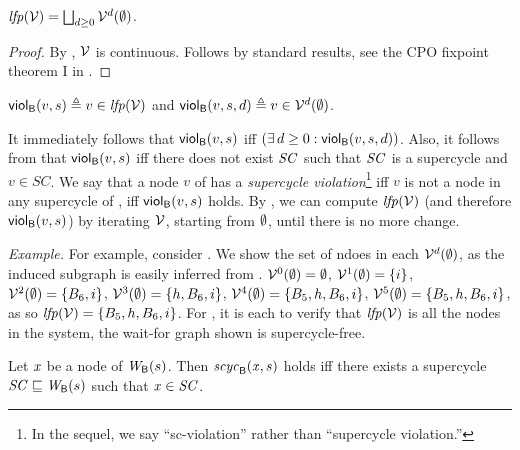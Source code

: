 \begin{proposition}  \label{prop:computeLFP}
$\lfp{\VFs} = \JOIN_{d \ge 0} \VFs^{d} (\ewfg)$.
\end{proposition}
%
\begin{proof}
By , $\VFs$ is continuous. Follows by standard results, \eg see the CPO fixpoint theorem I in 
\cite{DP02}.
\end{proof}



\begin{definition}
\label{def:supercycle-violation}
\label{def:supercycle.violation}
\label{defn:supercycle.violation}
$\scV{v}{s} \df v \in \lfp{\VFs}$ and 
$\scVd{v}{d}{s} \df v \in \VFs^{d} (\ewfg)$.
\end{definition}
%
It immediately follows that $\scV{v}{s}$ iff  $(\ex d \ge 0: \scVd{v}{d}{s})$.
Also, it follows from  that $\scV{v}{s}$ iff there does not exist $\SC$ such that $\SC$ is a supercycle and $v \in SC$.
We say that a node $v$ of  has a \emph{supercycle violation}\footnote{In the sequel, we say ``sc-violation'' rather than ``supercycle violation.''} iff $v$ is not a node in any supercycle of , 
\ie iff $\scV{v}{s}$ holds. 
By , we can compute $\lfp{\VFs}$ (and therefore $\scV{v}{s}$) by iterating $\VFs$, starting from $\ewfg$, until there is no more change.

\vspace{1ex}
\textit{Example.} 
For example, consider . We show the set of ndoes in each $\VFs^{d} (\ewfg)$, as the induced subgraph is easily inferred from .
$\VFs^{0} (\ewfg) = \ewfg$,
$\VFs^{1} (\ewfg) = \set{i}$, 
$\VFs^{2} (\ewfg) = \set{B_6, i}$, 
$\VFs^{3} (\ewfg) = \set{h, B_6, i}$, 
$\VFs^{4} (\ewfg) = \set{B_5, h, B_6, i}$, 
$\VFs^{5} (\ewfg) = \set{B_5, h, B_6, i}$, 
as so $\lfp{\VFs} = \set{B_5, h, B_6, i}$.
%
For , it is each to verify that $\lfp{\VFs}$ is all the nodes in the system, \ie the wait-for graph shown is supercycle-free.




\begin{definition}
\label{defn:supercycle.membership}
Let $\ndx$ be a node of $\wfg{\B}{s}$. Then $\scyc{\B}{s}{\ndx}$ holds iff there exists a supercycle $\SC \subg \wfg{\B}{s}$ such that
$\ndx \in \SC$.
\end{definition}





